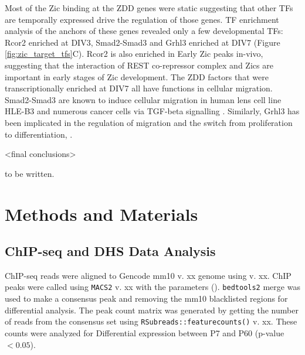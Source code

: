\documentclass[fleqn,10pt]{wlscirep}
\begin{document}
Most of the Zic binding at the ZDD genes were static suggesting that other TFs are temporally expressed drive the regulation of those genes. TF enrichment analysis of the anchors of these genes revealed only a few developmental TFs: Rcor2 enriched at DIV3,  Smad2-Smad3 and Grhl3 enriched at DIV7 (Figure \ref{fig:zic_target_tfs}C). Rcor2 is also enriched in Early Zic peaks in-vivo, suggesting that the interaction of REST co-repressor complex and Zics are important in early stages of Zic development. The ZDD factors that were transcriptionally enriched at DIV7 all have functions in cellular migration. Smad2-Smad3 are known to induce cellular migration in human lens cell line HLE-B3 \cite{Li2011ComparativeLine} and numerous cancer cells via TGF-beta signalling \cite{Yang2013TargetingCells, Yin2021M6APathway, Muscella2020TGF-1Activities}. Similarly, Grhl3 has been implicated in the regulation of migration and the switch from proliferation to differentiation, \cite{ Kashgari2021GRHL3Reepithelialization, Deng2021Grainyhead-likeBarrier}.



<final conclusions>

to be written. 

\section*{Methods and Materials}
\subsection*{ChIP-seq and DHS Data Analysis}
ChIP-seq reads were aligned to Gencode mm10 v. xx genome using  v. xx. ChIP peaks were called using \texttt{MACS2} v. xx with the parameters ().  \texttt{bedtools2} merge was used to make a consensus peak and removing the mm10 blacklisted regions \cite{} for differential analysis. The peak count matrix was generated by getting the number of reads from the consensus set using \texttt{RSubreads::featurecounts()} v. xx. These counts were analyzed for Differential expression between P7 and P60  (p-value $< 0.05$). 
\end{document}
